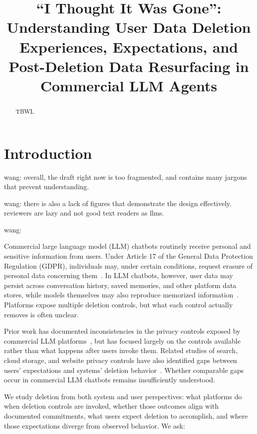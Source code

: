 \documentclass[conference,compsoc]{IEEEtran}
\title{``I Thought It Was Gone'': Understanding User Data Deletion Experiences, Expectations, and Post-Deletion Data Resurfacing in Commercial LLM Agents}
\author{\IEEEauthorblockN{Anonymous Author(s)}
\IEEEauthorblockA{Submission \#XXX}}
\newcommand{\xw}[1] {{\color{red}wang: #1}}
\begin{document}
\maketitle

\begin{abstract}
TBWL
\end{abstract}

\section{Introduction}
\label{sec:intro}

\xw{overall, the draft right now is too fragmented, and contains many jargons that prevent understanding.}

\xw{there is also a lack of figures that demonstrate the design effectively. reviewers are lazy and not good text readers as llms.}

\xw{}

Commercial large language model (LLM) chatbots routinely receive personal
and sensitive information from users. Under Article 17 of the General Data
Protection Regulation (GDPR), individuals may, under certain conditions,
request erasure of personal data concerning them~\cite{gdpr2016}. In LLM
chatbots, however, user data may persist across conversation history,
saved memories, and other platform data stores, while models themselves
may also reproduce memorized information~\cite{carlini2021extracting}.
Platforms expose multiple deletion controls, but what each control
actually removes is often unclear.

Prior work has documented inconsistencies in the privacy controls exposed
by commercial LLM platforms~\cite{li2026privacy}, but has focused largely
on the controls available rather than what happens after users invoke
them. Related studies of search, cloud storage, and website privacy
controls have also identified gaps between users' expectations and
systems' deletion behavior~\cite{bertram2019five,kang2015mydata,
ramokapane2017stupid,habib2019empirical}. Whether comparable gaps occur
in commercial LLM chatbots remains insufficiently understood.

We study deletion from both system and user perspectives: what platforms
do when deletion controls are invoked, whether those outcomes align with
documented commitments, what users expect deletion to accomplish, and
where those expectations diverge from observed behavior. We ask:
\end{document}
